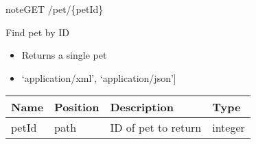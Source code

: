 \documentclass[letterpaper,10pt,english]{sphinxmanual}
\begin{document}
\begin{sphinxadmonition}{note}{GET /pet/\{petId\}}

Find pet by ID\begin{itemize}
\item {} 
Returns a single pet

\item {} 
\sphinxstylestrong{Produces: 
}{[}‘application/xml’, ‘application/json’{]}

\end{itemize}




\begin{savenotes}\sphinxattablestart
\centering
\begin{tabulary}{\linewidth}[t]{|T|T|T|T|}
\hline
\sphinxstyletheadfamily 
Name
&\sphinxstyletheadfamily 
Position
&\sphinxstyletheadfamily 
Description
&\sphinxstyletheadfamily 
Type
\\
\hline
petId
&
path
&
ID of pet to return
&
integer
\\
\hline
\end{tabulary}
\par
\sphinxattableend\end{savenotes}




\end{sphinxadmonition}
\end{document}
